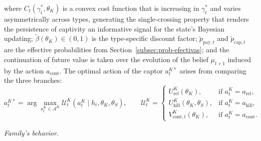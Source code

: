 \documentclass[review,authoryear,12pt]{elsarticle}
\theoremstyle{plain}
\theoremstyle{definition}
\newcommand{\1}{\mathbf{1}}
\begin{document}
where $C_t(\gamma_t^\ast,\theta_K)$ is a convex cost function that is increasing in $\gamma_t^\ast$ and varies asymmetrically across types, generating the single-crossing property that renders the persistence of captivity an informative signal for the state's Bayesian updating; $\tilde{\beta}(\theta_K)\in(0,1)$ is the type-specific discount factor; $\tilde{p}_{\mathrm{pay},t}$ and $\tilde{p}_{\mathrm{cap},t}$ are the effective probabilities from Section~\ref{subsec:prob-efectivas}; and the continuation of future value is taken over the evolution of the belief $\mu_{t+1}$ induced by the action $a_{\mathrm{cont}}$. The optimal action of the captor $a_t^{K\ast}$ arises from comparing the three branches:
\begin{equation}
a_t^{K\ast}=\arg\max_{a_t^K\in\mathcal{A}^K}\mathcal{U}^K_t(a_t^K\mid h_t,\theta_K,\theta_S),\qquad
\mathcal{U}^K_t=\begin{cases}U^K_{\mathrm{rel}}(\theta_K), & \text{if }a_t^K=a_{\mathrm{rel}},\\U^K_{\mathrm{kill}}(\theta_K,\theta_S), & \text{if }a_t^K=a_{\mathrm{kill}},\\V^K_{\mathrm{cont},t}(\theta_K), & \text{if }a_t^K=a_{\mathrm{cont}}.\end{cases}
\label{eq:k-argmax}
\end{equation}

\noindent\textit{Family's behavior.}
\end{document}
